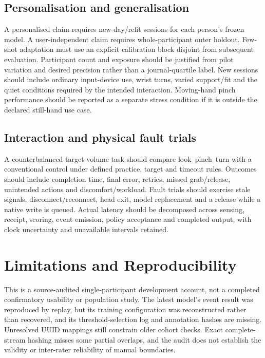 \subsection{Personalisation and generalisation}\label{personalisation-and-generalisation}

A personalised claim requires new-day/refit sessions for each person's frozen model. A user-independent claim requires whole-participant outer holdout. Few-shot adaptation must use an explicit calibration block disjoint from subsequent evaluation. Participant count and exposure should be justified from pilot variation and desired precision rather than a journal-quartile label. New sessions should include ordinary input-device use, wrist turns, varied support/fit and the quiet conditions required by the intended interaction. Moving-hand pinch performance should be reported as a separate stress condition if it is outside the declared still-hand use case.

\subsection{Interaction and physical fault trials}\label{interaction-and-physical-fault-trials}

A counterbalanced target-volume task should compare look--pinch--turn with a conventional control under defined practice, target and timeout rules. Outcomes should include completion time, final error, retries, missed grab/release, unintended actions and discomfort/workload. Fault trials should exercise stale signals, disconnect/reconnect, head exit, model replacement and a release while a native write is queued. Actual latency should be decomposed across sensing, receipt, scoring, event emission, policy acceptance and completed output, with clock uncertainty and unavailable intervals retained.

\section{Limitations and Reproducibility}\label{limitations-and-reproducibility}

This is a source-audited single-participant development account, not a completed confirmatory usability or population study. The latest model's event result was reproduced by replay, but its training configuration was reconstructed rather than recovered, and its threshold-selection log and annotation hashes are missing. Unresolved UUID mappings still constrain older cohort checks. Exact complete-stream hashing misses some partial overlaps, and the audit does not establish the validity or inter-rater reliability of manual boundaries.


